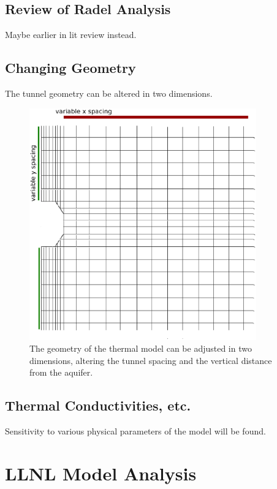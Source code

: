 \subsection{Review of Radel Analysis}

Maybe earlier in lit review instead. 

\subsection{Changing Geometry}

The tunnel geometry can be altered in two dimensions.

\begin{figure}[htbp!]
  \begin{center}
    \includegraphics[height=10cm]{./chapters/current/sindageom.eps}
  \end{center}
  \caption{The geometry of the thermal model can be adjusted in two dimensions, 
  altering the tunnel spacing and the vertical distance from the aquifer.}
  \label{fig:sindageom}
\end{figure}

\subsection{Thermal Conductivities, etc.}

Sensitivity to various physical parameters of the model will be found. 

\section{LLNL Model Analysis}

